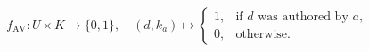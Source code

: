 \begin{equation}
f_{\text{AV}} : U \times K \to \{0,1\}, \quad 
(d, k_a) \mapsto 
\begin{cases} 
1, & \text{if } d \text{ was authored by } a,\\[6pt]
0, & \text{otherwise.}
\end{cases}
\label{eq:authorship_verification_function}
\end{equation}








